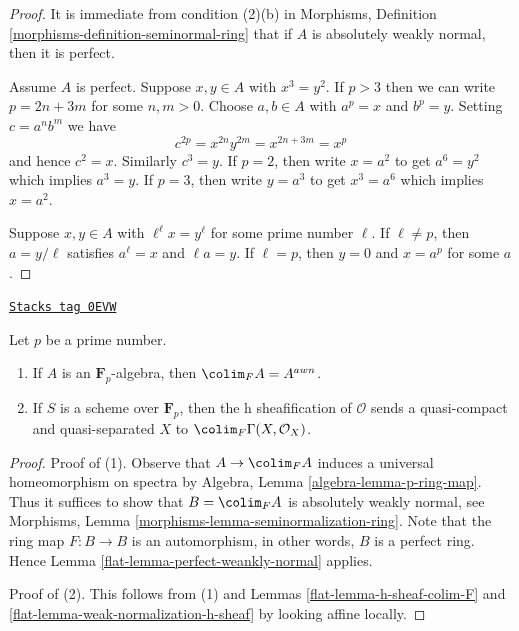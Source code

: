 \begin{proof}
It is immediate from condition (2)(b) in
Morphisms, Definition \ref{morphisms-definition-seminormal-ring}
that if $A$ is absolutely weakly normal, then it is perfect.

\medskip\noindent
Assume $A$ is perfect. Suppose $x, y \in A$ with $x^3 = y^2$.
If $p > 3$ then we can write $p = 2n + 3m$ for some $n, m > 0$.
Choose $a, b \in A$ with $a^p = x$ and $b^p = y$.
Setting $c = a^n b^m$ we have
$$
c^{2p} = x^{2n} y^{2m} = x^{2n + 3m} = x^p
$$
and hence $c^2 = x$. Similarly $c^3 = y$. If $p = 2$, then
write $x = a^2$ to get $a^6 = y^2$ which implies $a^3 = y$.
If $p = 3$, then write $y = a^3$ to get $x^3 = a^6$ which
implies $x = a^2$.

\medskip\noindent
Suppose $x, y \in A$ with $\ell^\ell x = y^\ell$ for some prime
number $\ell$. If $\ell \not = p$, then $a = y/\ell$ satisfies
$a^\ell = x$ and $\ell a = y$. If $\ell = p$, then
$y = 0$ and $x = a^p$ for some $a$.
\end{proof}

\begin{lemma}[Char p]
\label{flat-lemma-char-p}
\href{https://stacks.math.columbia.edu/tag/0EVW}{\texttt{Stacks tag 0EVW}}

Let $p$ be a prime number.
\begin{enumerate}
\item If $A$ is an $\mathbf{F}_p$-algebra, then $\colim_F A = A^{awn}$.
\item If $S$ is a scheme over $\mathbf{F}_p$, then the
h sheafification of $\mathcal{O}$ sends a quasi-compact
and quasi-separated $X$ to $\colim_F \Gamma(X, \mathcal{O}_X)$.
\end{enumerate}
\end{lemma}

\begin{proof}

Proof of (1). Observe that $A \to \colim_F A$ induces a
universal homeomorphism on spectra by
Algebra, Lemma \ref{algebra-lemma-p-ring-map}.
Thus it suffices to show that $B = \colim_F A$ is
absolutely weakly normal, see
Morphisms, Lemma \ref{morphisms-lemma-seminormalization-ring}.
Note that the ring map $F : B \to B$ is an automorphism,
in other words, $B$ is a perfect ring. Hence
Lemma \ref{flat-lemma-perfect-weankly-normal} applies.

\medskip\noindent
Proof of (2). This follows from (1) and
Lemmas \ref{flat-lemma-h-sheaf-colim-F} and
\ref{flat-lemma-weak-normalization-h-sheaf}
by looking affine locally.
\end{proof}

